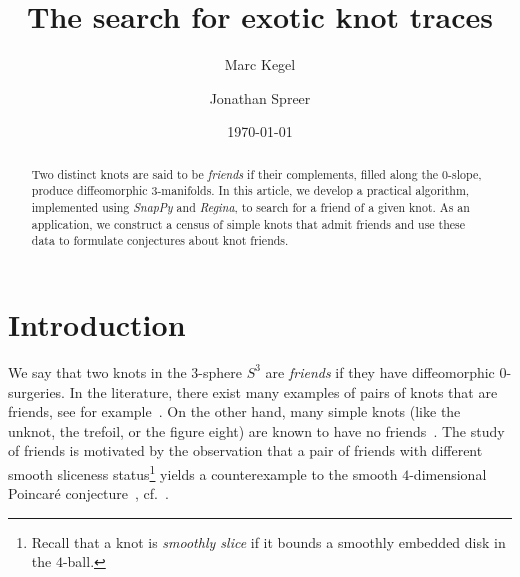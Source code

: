 \documentclass{amsart} %
\title{The search for exotic knot traces}
\author{Marc Kegel}
\author{Jonathan Spreer}
\date{\today}
\theoremstyle{thm}
\theoremstyle{definition}
\numberwithin{equation}{section}
\begin{document}
\begin{abstract}
Two distinct knots are said to be {\em friends} if their complements, filled along the $0$-slope, produce diffeomorphic $3$-manifolds. In this article, we develop a practical algorithm, implemented using {\em SnapPy} and {\em Regina}, to search for a friend of a given knot. As an application, we construct a census of simple knots that admit friends and use these data to formulate conjectures about knot friends.
\end{abstract}


\makeatletter
{}
\makeatother%



\maketitle

\section{Introduction}

We say that two knots in the $3$-sphere $S^3$ are \textit{friends} if they have diffeomorphic $0$-surgeries. 
In the literature, there exist many examples of pairs of knots that are friends, see for example~\cite{Osoinach_annulus,Miller_Piccirillo_traces,Piccirillo_shake_genus,Manolescu_Piccirillo_0_surgery}. On the other hand, many simple knots (like the unknot, the trefoil, or the figure eight) are known to have no friends~\cite{Gabai,Ozvath_Szabo_trefoil_figeight,Baldwin_Sivek_0_inf}. 
The study of friends is motivated by the observation that a pair of friends with different smooth sliceness status\footnote{Recall that a knot is \textit{smoothly slice} if it bounds a smoothly embedded disk in the $4$-ball.} yields a counterexample to the smooth $4$-dimensional Poincaré conjecture~\cite[Problem 1.19]{Kirby1997Problems}, cf.~\cite{Freedman_Gompf_Man_Machine,Manolescu_Piccirillo_0_surgery}.
\end{document}
